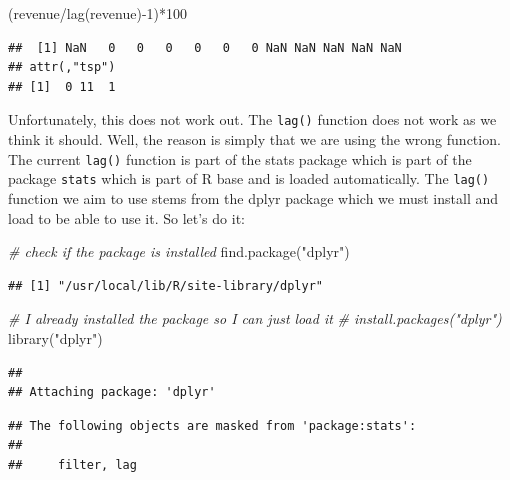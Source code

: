 \documentclass[
  12pt,
  oneside]{book}
\newenvironment{Shaded}{\begin{snugshade}}{\end{snugshade}}
\newcommand{\CommentTok}[1]{\textcolor[rgb]{0.56,0.35,0.01}{\textit{#1}}}
\newcommand{\DecValTok}[1]{\textcolor[rgb]{0.00,0.00,0.81}{#1}}
\newcommand{\FunctionTok}[1]{\textcolor[rgb]{0.00,0.00,0.00}{#1}}
\newcommand{\NormalTok}[1]{#1}
\newcommand{\SpecialCharTok}[1]{\textcolor[rgb]{0.00,0.00,0.00}{#1}}
\newcommand{\StringTok}[1]{\textcolor[rgb]{0.31,0.60,0.02}{#1}}
\theoremstyle{definition}
\theoremstyle{definition}
\theoremstyle{definition}
\theoremstyle{definition}
\theoremstyle{remark}
\begin{document}
\begin{Shaded}
\begin{Highlighting}[]
\NormalTok{(revenue}\SpecialCharTok{/}\FunctionTok{lag}\NormalTok{(revenue)}\SpecialCharTok{{-}}\DecValTok{1}\NormalTok{)}\SpecialCharTok{*}\DecValTok{100} 
\end{Highlighting}
\end{Shaded}

\begin{verbatim}
##  [1] NaN   0   0   0   0   0   0 NaN NaN NaN NaN NaN
## attr(,"tsp")
## [1]  0 11  1
\end{verbatim}

Unfortunately, this does not work out. The \texttt{lag()} function does not work as we think it should. Well, the reason is simply that we are using the wrong function. The current \texttt{lag()} function is part of the stats package which is part of the package \texttt{stats} which is part of R base and is loaded automatically. The \texttt{lag()} function we aim to use stems from the dplyr package which we must install and load to be able to use it. So let's do it:

\begin{Shaded}
\begin{Highlighting}[]
\CommentTok{\# check if the package is installed}
\FunctionTok{find.package}\NormalTok{(}\StringTok{"dplyr"}\NormalTok{)}
\end{Highlighting}
\end{Shaded}

\begin{verbatim}
## [1] "/usr/local/lib/R/site-library/dplyr"
\end{verbatim}

\begin{Shaded}
\begin{Highlighting}[]
\CommentTok{\# I already installed the package so I can just load it}
\CommentTok{\# install.packages("dplyr")}
\FunctionTok{library}\NormalTok{(}\StringTok{"dplyr"}\NormalTok{)}
\end{Highlighting}
\end{Shaded}

\begin{verbatim}
## 
## Attaching package: 'dplyr'
\end{verbatim}

\begin{verbatim}
## The following objects are masked from 'package:stats':
## 
##     filter, lag
\end{verbatim}
\end{document}
